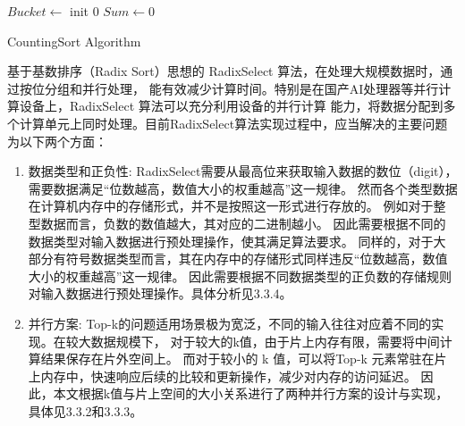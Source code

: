 \begin{algorithm}
    \SetAlgoNoLine 
    $Bucket \leftarrow$ init $0$ 
    $Sum \leftarrow 0$\;\\
    \caption{CountingSort Algorithm}
\end{algorithm}


基于基数排序（Radix Sort）思想的 RadixSelect 算法，在处理大规模数据时，通过按位分组和并行处理，
能有效减少计算时间。特别是在国产AI处理器等并行计算设备上，RadixSelect 算法可以充分利用设备的并行计算
能力，将数据分配到多个计算单元上同时处理。目前RadixSelect算法实现过程中，应当解决的主要问题为以下两个方面：
\begin{enumerate}
    \item{数据类型和正负性}:
    RadixSelect需要从最高位来获取输入数据的数位（digit），需要数据满足“位数越高，数值大小的权重越高”这一规律。
    然而各个类型数据在计算机内存中的存储形式，并不是按照这一形式进行存放的。
    例如对于整型数据而言，负数的数值越大，其对应的二进制越小。
    因此需要根据不同的数据类型对输入数据进行预处理操作，使其满足算法要求。
    同样的，对于大部分有符号数据类型而言，其在内存中的存储形式同样违反“位数越高，数值大小的权重越高”这一规律。
    因此需要根据不同数据类型的正负数的存储规则对输入数据进行预处理操作。具体分析见3.3.4。

    \item{并行方案}:
    Top-k的问题适用场景极为宽泛，不同的输入往往对应着不同的实现。在较大数据规模下，
    对于较大的k值，由于片上内存有限，需要将中间计算结果保存在片外空间上。
    而对于较小的 k 值，可以将Top-k 元素常驻在片上内存中，快速响应后续的比较和更新操作，减少对内存的访问延迟。
    因此，本文根据k值与片上空间的大小关系进行了两种并行方案的设计与实现，具体见3.3.2和3.3.3。


\end{enumerate}

